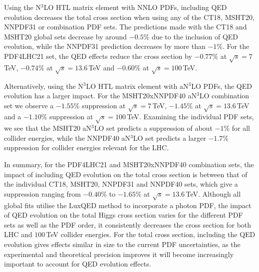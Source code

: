Using the N$^3$LO HTL matrix element with NNLO PDFs, including QED evolution decreases the total cross section when using any of the CT18, MSHT20, NNPDF31 or combination PDF sets.
The predictions made with the CT18 and MSHT20 global sets decrease by around $-0.5\%$ due to the inclusion of QED evolution, while the NNPDF31 prediction decreases by more than $-1\%$. 
For the PDF4LHC21 set, the QED effects reduce the cross section by $-0.77\%$ at $\sqrt{s} = 7$\,TeV, $-0.74\%$ at $\sqrt{s} = 13.6$\,TeV and $-0.60\%$ at $\sqrt{s} = 100$\,TeV.



Alternatively, using the N$^3$LO HTL matrix element with  aN$^3$LO PDFs, the QED evolution has a larger impact.
For the MSHT20xNNPDF40 aN$^3$LO combination set we observe a $-1.55\%$ suppression at $\sqrt{s} = 7$\,TeV,  $-1.45\%$ at $\sqrt{s} = 13.6$\,TeV and a $-1.10\%$ suppression at $\sqrt{s} = 100$\,TeV.
Examining the individual PDF sets, we see that the MSHT20 aN$^3$LO set predicts a suppression of about $-1\%$ for all collider energies, while the NNPDF40 aN$^3$LO set predicts a larger $-1.7\%$ suppression for collider energies relevant for the LHC.

In summary, for the PDF4LHC21 and MSHT20xNNPDF40 combination sets, the impact of including QED evolution on the total cross section is between that of the individual CT18, MSHT20, NNPDF31 and NNPDF40 sets, which give a suppression ranging from $-0.40\%$ to $-1.65\%$ at $\sqrt{s}= 13.6$\,TeV.
Although all global fits utilise the LuxQED method to incorporate a photon PDF, the impact of QED evolution on the total Higgs cross section varies for the different PDF sets as well as the PDF order, it consistently decreases the cross section for both LHC and $100$\,TeV collider energies.
For the total cross section, including the QED evolution gives effects similar in size to the current PDF uncertainties, as the experimental and theoretical precision improves it will become increasingly important to account for QED evolution effects.

